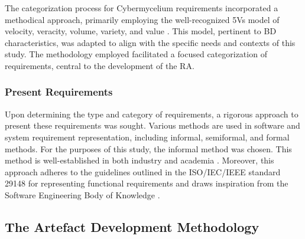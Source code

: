 \documentclass[review]{elsarticle}
\begin{document}
The categorization process for Cybermycelium requirements incorporated a methodical approach, primarily employing the well-recognized 5Vs model of velocity, veracity, volume, variety, and value \cite{Bughin2016, rad2017big}. This model, pertinent to BD characteristics, was adapted to align with the specific needs and contexts of this study. The methodology employed facilitated a focused categorization of requirements, central to the development of the RA.





\subsubsection{Present Requirements}


Upon determining the type and category of requirements, a rigorous approach to present these requirements was sought. Various methods are used in software and system requirement representation, including informal, semiformal, and formal methods. For the purposes of this study, the informal method was chosen. This method is well-established in both industry and academia \cite{kassab2014state}. Moreover, this approach adheres to the guidelines outlined in the ISO/IEC/IEEE standard 29148 \cite{ISO29148} for representing functional requirements and draws inspiration from the Software Engineering Body of Knowledge \cite{abran2004software}. 


\subsection{The Artefact Development Methodology}
\end{document}
